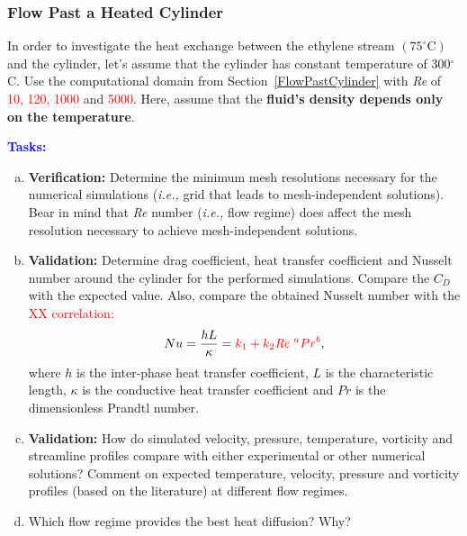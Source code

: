 \documentclass[12pts,a4paper,amsmath,amssymb,floatfix]{article}%
\newcommand{\frc}{\displaystyle\frac}
\newcommand{\red}{\textcolor{red}}
\newcommand{\blue}{\textcolor{blue}}
\newcommand{\ie}{{\it i.e., }}
\newcommand\Rey{\mbox{\textit{Re}}\,\,}
\begin{document}

     \subsubsection{Flow Past a Heated Cylinder}\label{FlowPastHeatedCylinder}
     In order to investigate the heat exchange between the ethylene stream $\left(\text{75}^{\circ}\text{C}\right)$ and the cylinder, let's assume that the cylinder has constant temperature of 300$^{\circ}$C. Use the computational domain from Section~\ref{FlowPastCylinder} with \Rey of \red{10, 120, 1000} and \red{5000}. Here, assume that the {\bf fluid's density depends only on the temperature}.

     \begin{shaded}
        \begin{center} \blue{\bf Tasks: } \end{center}
        \begin{enumerate}[a)]
           \item {\bf Verification:} Determine the minimum mesh resolutions necessary for the numerical simulations (\ie grid that leads to mesh-independent solutions). Bear in mind that \Rey number (\ie flow regime) does affect the mesh resolution necessary to achieve mesh-independent solutions.
           \item {\bf Validation:} Determine drag coefficient, heat transfer coefficient and Nusselt number around the cylinder for the performed simulations. Compare the $C_{D}$ with the expected value. Also, compare the obtained Nusselt number with the \red{ XX correlation:}
             \begin{displaymath}
               Nu = \frc{h L}{\kappa} = \red{k_{1} + k_{2}\Rey^{a}Pr^{b}},
             \end{displaymath}
             where $h$ is the inter-phase heat transfer coefficient, $L$ is the characteristic length, $\kappa$ is the conductive heat transfer coefficient and $Pr$ is the dimensionless Prandtl number.
           \item {\bf Validation:} How do simulated velocity, pressure, temperature, vorticity and streamline profiles compare with either experimental or other numerical solutions? Comment on expected temperature, velocity, pressure and vorticity profiles (based on the literature) at different flow regimes.
           \item Which flow regime provides the best heat diffusion? Why?
        \end{enumerate}
     \end{shaded}
\end{document}
